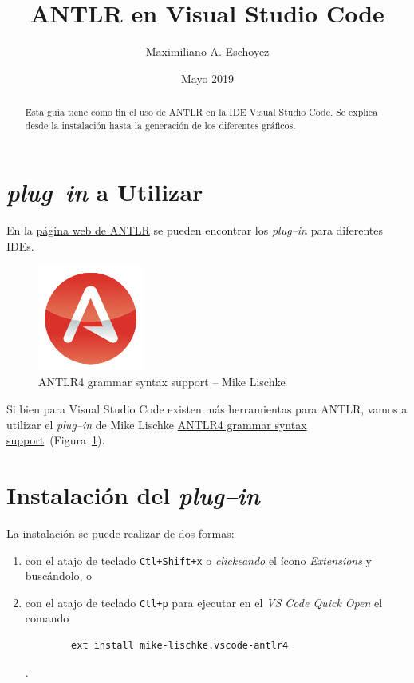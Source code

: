 \documentclass[a5paper,10pt]{article}
\author{Maximiliano A. Eschoyez}
\title{ANTLR en Visual Studio Code}
\date{Mayo 2019}
\begin{document}
\maketitle

\begin{abstract}
	Esta guía tiene como fin el uso de ANTLR en la IDE Visual Studio Code. Se explica desde la instalación hasta la generación de los diferentes gráficos.
\end{abstract}

\section{\emph{plug--in} a Utilizar}
\label{intro}

En la \href{https://www.antlr.org/tools.html}{página web de ANTLR} se pueden encontrar los \emph{plug--in} para diferentes IDEs.

\begin{figure}[b]
	\centering
	\includegraphics[width=3.5cm]{IconoANTLRvscode}
	\caption{ANTLR4 grammar syntax support -- Mike Lischke}
	\label{icono}
\end{figure}

Si bien para Visual Studio Code existen más herramientas para ANTLR, vamos a utilizar el \emph{plug--in} de Mike Lischke \href{https://marketplace.visualstudio.com/items?itemName=mike-lischke.vscode-antlr4}{ANTLR4 grammar syntax support}~(Figura~\ref{icono}).


\section{Instalación del \emph{plug--in}}
\label{instalacion}

La instalación se puede realizar de dos formas:
\begin{enumerate}
	\item con el atajo de teclado \verb|Ctl+Shift+x| o \emph{clickeando} el ícono \emph{Extensions} y buscándolo, o
    \item con el atajo de teclado \verb|Ctl+p| para ejecutar en el \emph{VS Code Quick Open} el comando
    \begin{verbatim}
		ext install mike-lischke.vscode-antlr4
	\end{verbatim}.
\end{enumerate}
\end{document}

